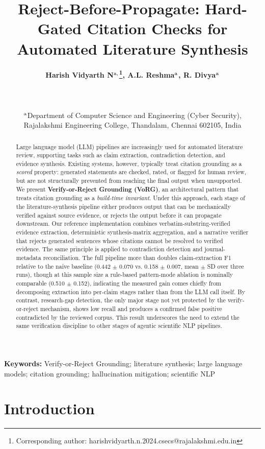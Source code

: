 \documentclass[11pt]{article}
\title{\textbf{Reject-Before-Propagate: Hard-Gated Citation Checks for Automated Literature Synthesis}}
\author{\begin{tabular}{rcl}
\textbf{Harish Vidyarth N$^{\text a,}$\thanks{Corresponding author: harishvidyarth.n.2024.csecs@rajalakshmi.edu.in}, A.L. Reshma$^{\text a}$, R. Divya$^{\text a}$}
\end{tabular}\\
\\
\begin{tabular}{c}
$^{\text a}$\small Department of Computer Science and Engineering (Cyber Security), \\Rajalakshmi Engineering College, Thandalam, Chennai 602105, India \\
\end{tabular}}
\date{}
\begin{document}
\maketitle
\vspace{-0.5cm}
\begin{abstract}
{\small Large language model (LLM) pipelines are increasingly used for automated literature review, supporting tasks such as claim extraction, contradiction detection, and evidence synthesis. Existing systems, however, typically treat citation grounding as a \emph{scored} property: generated statements are checked, rated, or flagged for human review, but are not structurally prevented from reaching the final output when unsupported. We present \textbf{Verify-or-Reject Grounding (VoRG)}, an architectural pattern that treats citation grounding as a \emph{build-time invariant}. Under this approach, each stage of the literature-synthesis pipeline either produces output that can be mechanically verified against source evidence, or rejects the output before it can propagate downstream. Our reference implementation combines verbatim-substring-verified evidence extraction, deterministic synthesis-matrix aggregation, and a narrative verifier that rejects generated sentences whose citations cannot be resolved to verified evidence. The same principle is applied to contradiction detection and journal-metadata reconciliation. The full pipeline more than doubles claim-extraction F1 relative to the naive baseline (0.442 $\pm$ 0.070 vs. 0.158 $\pm$ 0.007, mean $\pm$ SD over three runs), though at this sample size a rule-based pattern-mode ablation is nominally comparable (0.510 $\pm$ 0.152), indicating the measured gain comes chiefly from decomposing extraction into per-claim stages rather than from the LLM call itself. By contrast, research-gap detection, the only major stage not yet protected by the verify-or-reject mechanism, shows low recall and produces a confirmed false positive contradicted by the reviewed corpus. This result underscores the need to extend the same verification discipline to other stages of agentic scientific NLP pipelines.}
\end{abstract}
\textbf{Keywords:} {\small Verify-or-Reject Grounding; literature synthesis; large language models; citation grounding; hallucination mitigation; scientific NLP}

\section{Introduction}
\end{document}
